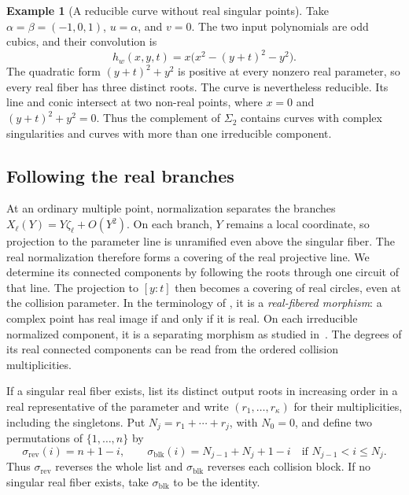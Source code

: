 \documentclass[12pt,reqno]{amsart}
\theoremstyle{definition}
\newtheorem{example}[example]{Example}
\theoremstyle{remark}
\begin{document}
\begin{example}[A reducible curve without real singular points]
\label{ex:reducible-real-smooth-finite-free-curve}
Take \(\alpha=\beta=(-1,0,1)\), \(u=\alpha\), and \(v=0\).
The two input polynomials are odd cubics, and their convolution is
\[
 h_w(x,y,t)=x\bigl(x^2-(y+t)^2-y^2\bigr).
\]
The quadratic form \((y+t)^2+y^2\) is positive at every nonzero real
parameter, so every real fiber has three distinct roots.  The curve is
nevertheless reducible.  Its line and conic intersect at two non-real points,
where \(x=0\) and \((y+t)^2+y^2=0\).  Thus the complement of
\(\Sigma_2\) contains curves with complex singularities and curves
with more than one irreducible component.
\end{example}

\subsection{Following the real branches}

At an ordinary multiple point, normalization separates the branches \(X_\ell(Y)=Y\zeta_\ell+O(Y^2)\). On each branch, \(Y\) remains a local coordinate, so projection to the parameter line is unramified even above the singular fiber. The real normalization therefore forms a covering of the real projective line. We determine its connected components by following the roots through one circuit of that line.
The projection to \([y:t]\) then becomes a covering of real circles,
even at the collision parameter.  In the terminology of
\cite{KummerShamovich20}, it is a \emph{real-fibered morphism}: a
complex point has real image if and only if it is real.  On each
irreducible normalized component, it is a separating morphism as studied
in~\cite{KummerShaw20}.  The degrees of its real connected components
can be read from the ordered collision multiplicities.

If a singular real fiber exists, list its distinct output roots in
increasing order in a real representative of the parameter and write
\((r_1,\ldots,r_{\kappa})\) for their multiplicities, including the
singletons.  Put \(N_j=r_1+\cdots+r_j\), with \(N_0=0\), and define
two permutations of \(\{1,\ldots,n\}\) by
\begin{equation}\label{eq:collision-reversal-permutations}
 \sigma_{\mathrm{rev}}(i)=n+1-i,
 \qquad
 \sigma_{\mathrm{blk}}(i)=N_{j-1}+N_j+1-i
 \quad\text{if }N_{j-1}<i\leq N_j.
\end{equation}
Thus \(\sigma_{\mathrm{rev}}\) reverses the whole list and \(\sigma_{\mathrm{blk}}\) reverses each collision
block.  If no singular real fiber exists, take \(\sigma_{\mathrm{blk}}\) to be the identity.
\end{document}
